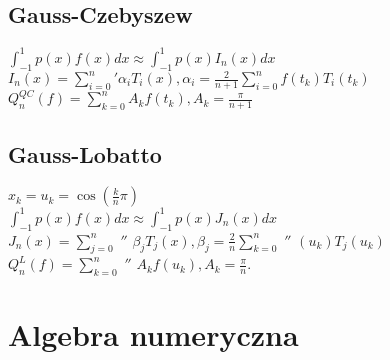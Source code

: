\documentclass[a4paper,twocolumn]{article}
\begin{document}
\subsection{Gauss-Czebyszew}
\noindent
$\int_{-1}^1p(x)f(x)dx \approx \int_{-1}^1p(x)I_n(x)dx$ \\
$ I_n(x)=\sum_{i=0}^{n}  \prime \alpha_iT_i(x), \alpha_i=\frac{2}{n+1}\sum_{i=0}^nf(t_k)T_i(t_k)$\\
$Q_n^{QC}(f)=\sum_{k=0}^{n}A_kf(t_k), A_k=\frac{\pi}{n+1}$
\subsection{Gauss-Lobatto}
\noindent
$x_k=u_k=\cos\left(\frac{k}{n}\pi\right)$ \\
$\int_{-1}^1p(x)f(x)dx \approx \int_{-1}^1p(x)J_n(x)dx$ \\
$ J_n(x)=\sum_{j=0}^{n}  $ $''$ $ \beta_jT_j(x), \beta_j=\frac{2}{n}\sum_{k=0}^n $ $''$ $  (u_k)T_j(u_k)$\\
$Q_n^{L}(f)=\sum_{k=0}^{n} $ $''$ $ A_kf(u_k), A_k=\frac{\pi}{n}.$



\section{Algebra numeryczna}
\end{document}
